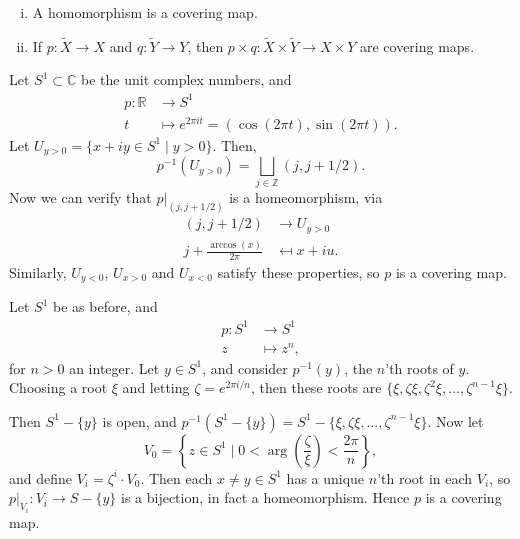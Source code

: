 \documentclass[12pt]{article}
\begin{document}
\begin{exbox}
	\begin{enumerate}[(i)]
		\item A homomorphism is a covering map.
		\item If $p : \tilde X \to X$ and $q : \tilde Y \to Y$, then $p \times q : \tilde X \times \tilde Y \to X \times Y$ are covering maps.
	\end{enumerate}
\end{exbox}

\begin{exbox}
	Let $S^1 \subset \mathbb{C}$ be the unit complex numbers, and
	\begin{align*}
		p : \mathbb{R} & \to S^1 \\
		t &\mapsto e^{2\pi i t} = (\cos(2 \pi t), \sin(2 \pi t)).
	\end{align*}
	Let $U_{y > 0} = \{x + iy \in S^1 \mid y > 0\}$. Then,
	\[
	p^{-1}(U_{y > 0}) = \bigsqcup_{j \in \mathbb{Z}}(j, j + 1/2).
	\]
	Now we can verify that $p|_{(j, j+1/2)}$ is a homeomorphism, via
	\begin{align*}
		(j, j + 1/2) &\to U_{y>0} \\
		j + \frac{\arccos(x)}{2 \pi} &\mapsfrom x + iu.
	\end{align*}
	Similarly, $U_{y < 0}$, $U_{x > 0}$ and $U_{x < 0}$ satisfy these properties, so $p$ is a covering map.
\end{exbox}

\begin{exbox}
	Let $S^1$ be as before, and
	\begin{align*}
		p : S^1 &\to S^1 \\
		z &\mapsto z^n,
	\end{align*}
	for $n > 0$ an integer. Let $y \in S^1$, and consider $p^{-1}(y)$, the $n$'th roots of $y$. Choosing a root $\xi$ and letting $\zeta = e^{2 \pi i/n}$, then these roots are $\{\xi, \zeta \xi, \zeta^2 \xi, \ldots, \zeta^{n-1} \xi\}$.

	Then $S^1 - \{y\}$ is open, and $p^{-1}(S^1 - \{y\}) = S^1 - \{\xi, \zeta \xi, \ldots, \zeta^{n-1} \xi\}$. Now let
	\[
		V_0 = \left\{z \in S^1 \mid 0 < \arg \left( \frac{\zeta}{\xi} \right) < \frac{2 \pi}{n} \right\},
	\]
	and define $V_i = \zeta^i \cdot V_0$. Then each $x \neq y \in S^1$ has a unique $n$'th root in each $V_i$, so $p|_{V_i} : V_i \to S - \{y\}$ is a bijection, in fact a homeomorphism. Hence $p$ is a covering map.
\end{exbox}
\end{document}
